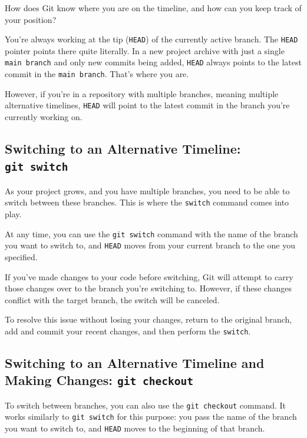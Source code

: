 \documentclass[
  letterpaper,
  DIV=11,
  numbers=noendperiod]{scrreprt}
\begin{document}
How does Git know where you are on the timeline, and how can you keep
track of your position?

You're always working at the tip (\texttt{HEAD}) of the currently active
branch. The \texttt{HEAD} pointer points there quite literally. In a new
project archive with just a single \texttt{main\ branch} and only new
commits being added, \texttt{HEAD} always points to the latest commit in
the \texttt{main\ branch}. That's where you are.

However, if you're in a repository with multiple branches, meaning
multiple alternative timelines, \texttt{HEAD} will point to the latest
commit in the branch you're currently working on.

\subsection{\texorpdfstring{Switching to an Alternative Timeline:
\texttt{git\ switch}}{Switching to an Alternative Timeline: git switch}}\label{switching-to-an-alternative-timeline-git-switch}

As your project grows, and you have multiple branches, you need to be
able to switch between these branches. This is where the \texttt{switch}
command comes into play.

At any time, you can use the \texttt{git\ switch} command with the name
of the branch you want to switch to, and \texttt{HEAD} moves from your
current branch to the one you specified.

If you've made changes to your code before switching, Git will attempt
to carry those changes over to the branch you're switching to. However,
if these changes conflict with the target branch, the switch will be
canceled.

To resolve this issue without losing your changes, return to the
original branch, add and commit your recent changes, and then perform
the \texttt{switch}.

\subsection{\texorpdfstring{Switching to an Alternative Timeline and
Making Changes:
\texttt{git\ checkout}}{Switching to an Alternative Timeline and Making Changes: git checkout}}\label{switching-to-an-alternative-timeline-and-making-changes-git-checkout}

To switch between branches, you can also use the \texttt{git\ checkout}
command. It works similarly to \texttt{git\ switch} for this purpose:
you pass the name of the branch you want to switch to, and \texttt{HEAD}
moves to the beginning of that branch.
\end{document}
